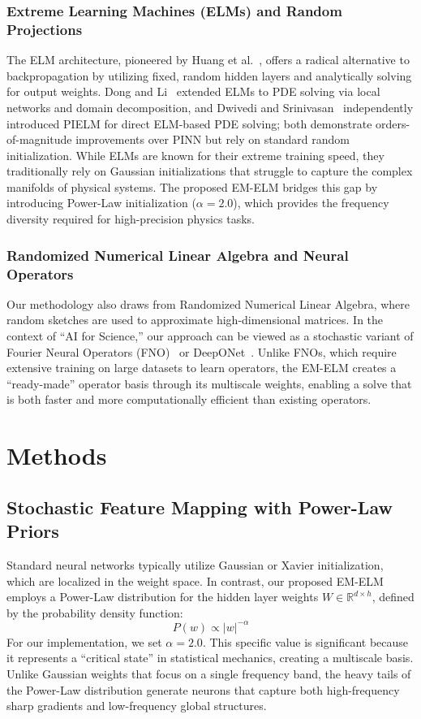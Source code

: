 \documentclass[final,12pt,3p,times,fleqn]{elsarticle}
\begin{document}
\subsubsection{Extreme Learning Machines (ELMs) and Random Projections}

The ELM architecture, pioneered by Huang et al.~\cite{huang2006extreme}, offers a radical alternative to backpropagation by utilizing fixed, random hidden layers and analytically solving for output weights. Dong and Li~\cite{dong2021extreme} extended ELMs to PDE solving via local networks and domain decomposition, and Dwivedi and Srinivasan~\cite{dwivedi2020pielm} independently introduced PIELM for direct ELM-based PDE solving; both demonstrate orders-of-magnitude improvements over PINN but rely on standard random initialization. While ELMs are known for their extreme training speed, they traditionally rely on Gaussian initializations that struggle to capture the complex manifolds of physical systems. The proposed EM-ELM bridges this gap by introducing Power-Law initialization ($\alpha=2.0$), which provides the frequency diversity required for high-precision physics tasks.

\subsubsection{Randomized Numerical Linear Algebra and Neural Operators}

Our methodology also draws from Randomized Numerical Linear Algebra, where random sketches are used to approximate high-dimensional matrices. In the context of ``AI for Science,'' our approach can be viewed as a stochastic variant of Fourier Neural Operators (FNO)~\cite{li2020fourier} or DeepONet~\cite{lu2021deeponet}. Unlike FNOs, which require extensive training on large datasets to learn operators, the EM-ELM creates a ``ready-made'' operator basis through its multiscale weights, enabling a solve that is both faster and more computationally efficient than existing operators.


\section{Methods}

\subsection{Stochastic Feature Mapping with Power-Law Priors}

Standard neural networks typically utilize Gaussian or Xavier initialization, which are localized in the weight space. In contrast, our proposed EM-ELM employs a Power-Law distribution for the hidden layer weights $W \in \mathbb{R}^{d \times h}$, defined by the probability density function:
$$P(w) \propto |w|^{-\alpha}$$
For our implementation, we set $\alpha=2.0$. This specific value is significant because it represents a ``critical state'' in statistical mechanics, creating a multiscale basis. Unlike Gaussian weights that focus on a single frequency band, the heavy tails of the Power-Law distribution generate neurons that capture both high-frequency sharp gradients and low-frequency global structures.
\end{document}
